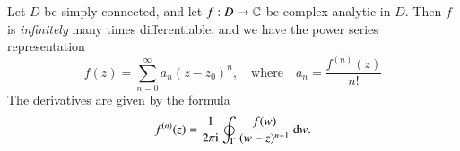 \documentclass[11pt,preview]{standalone}
\begin{document}

\begin{myTheoremx}[width=0.64\textwidth]{}{}
     Let $D$ be simply connected, and let $f : D \to \mathbb{C}$ be complex analytic in $D$. Then $f$ is \emph{infinitely} many times differentiable, and we have the power series representation
     \begin{equation}
        f(z) = \sum_{n=0}^\infty a_n(z-z_0)^n, \quad \text{where} \quad a_n = \frac{f^{(n)}(z)}{n!} 
     \end{equation}
     The derivatives are given by the formula
     \begin{equation}
         f^{(n)}(z) = \frac{1}{2\pi\mathrm{i}} \oint_\Gamma \frac{f(w)}{(w-z)^{n+1}} \, \mathrm{d} w.
     \end{equation}
\end{myTheoremx}
\end{document}

